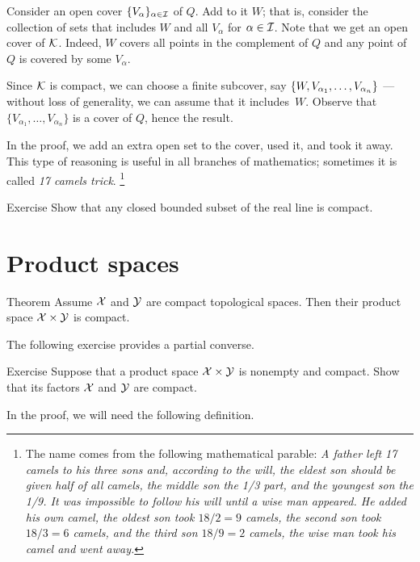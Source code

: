Consider an open cover $\{V_\alpha\}_{\alpha\in\mathcal{I}}$ of $Q$.
Add to it $W$; that is, consider the collection of sets that includes $W$ and all $V_\alpha$ for $\alpha\in\mathcal{I}$.
Note that we get an open cover of $\mathcal{K}$.
Indeed, $W$ covers all points in the complement of $Q$ and any point of $Q$ is covered by some $V_\alpha$.

Since $\mathcal{K}$ is compact, we can choose a finite subcover, say $\{W,V_{\alpha_1},\z\dots,V_{\alpha_n}\}$ --- without loss of generality, we can assume that it includes~$W$.
Observe that $\{V_{\alpha_1},\dots,V_{\alpha_n}\}$ is a cover of $Q$, hence the result.
\qeds

In the proof, we add an extra open set to the cover, used it, and took it away.
This type of reasoning is useful in all branches of mathematics;
sometimes it is called \emph{17 camels trick}.%
\footnote{The name comes from the following mathematical parable:
\textit{A father left 17 camels to his three sons and, according to the will,
the eldest son should be given half of all camels,
the middle son the 1/3 part,
and the youngest son the 1/9.
It was impossible to follow his will until a wise man appeared.
He added his own camel, the oldest son took $18/2=9$ camels, the second son took $18/3=6$ camels, and the third son $18/9=2$ camels, the wise man took his camel and went away.}}


\begin{thm}{Exercise}
Show that any closed bounded subset of the real line is compact.
\end{thm}

 
\section{Product spaces}

\begin{thm}{Theorem}\label{thm:compact-product}
Assume $\mathcal{X}$ and $\mathcal{Y}$ are compact topological spaces.
Then their product space $\mathcal{X}\times\mathcal{Y}$ is compact.
\end{thm}

The following exercise provides a partial converse.

\begin{thm}{Exercise}
Suppose that a product space $\mathcal{X}\times\mathcal{Y}$ is nonempty and compact.
Show that its factors $\mathcal{X}$ and $\mathcal{Y}$ are compact.
\end{thm} 


In the proof, we will need the following definition.

